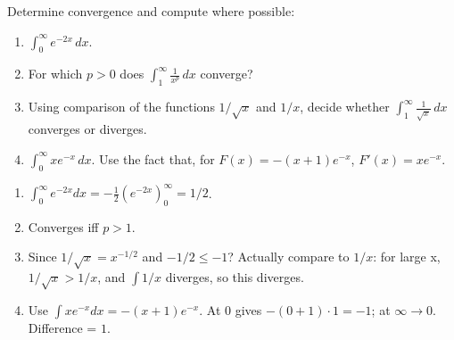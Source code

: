 \documentclass[11pt]{exam}
\begin{document}
\begin{questions}
\question[2]
Determine convergence and compute where possible:
\begin{enumerate}[label=(\alph*)]
\item \(\displaystyle\int_{0}^{\infty}e^{-2x}\,dx\).
\item For which \(p>0\) does \(\int_{1}^{\infty}\frac{1}{x^p}\,dx\) converge?
\item Using comparison of the functions $1/\sqrt{x}$ and $1/x$, decide whether \(\int_{1}^{\infty}\frac{1}{\sqrt{x}}\,dx\) converges or diverges.
\item \(\displaystyle\int_{0}^{\infty}x e^{-x}\,dx\). Use the fact that, for $F(x) = - (x+1)e^{-x}$, $F'(x) = x e^{-x}$.
\end{enumerate}

\begin{solution}
\begin{enumerate}[label=(\alph*)]
\item \(\int_0^\infty e^{-2x}dx = -\tfrac12 (e^{-2x})_0^\infty = 1/2\).
\item Converges iff \(p>1\).
\item Since \(1/\sqrt{x}=x^{-1/2}\) and \(-1/2\le-1\)? Actually compare to \(1/x\): for large x, \(1/\sqrt{x}>1/x\), and \(\int1/x\) diverges, so this diverges.
\item Use \(\int x e^{-x}dx = - (x+1)e^{-x}\).  At \(0\) gives \(-(0+1)\cdot1=-1\); at \(\infty\to0\).  Difference = \(1\).
\end{enumerate}
\end{solution}

\end{questions}
\end{document}
